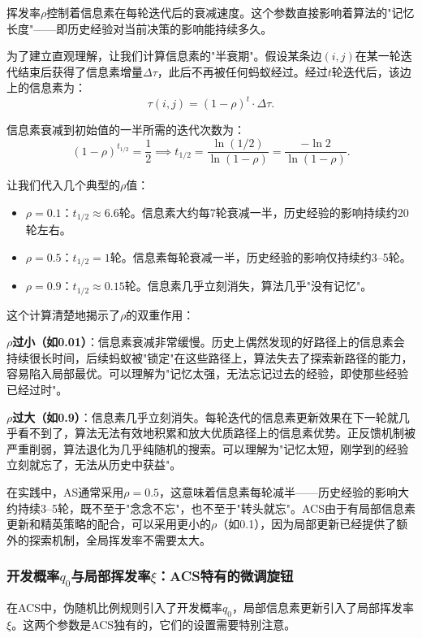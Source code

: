 \documentclass[lang=cn,zihao=-4,a4paper,fontset=windows]{beautybook}
\begin{document}
挥发率$\rho$控制着信息素在每轮迭代后的衰减速度。这个参数直接影响着算法的"记忆长度"——即历史经验对当前决策的影响能持续多久。

为了建立直观理解，让我们计算信息素的"半衰期"。假设某条边$(i,j)$在某一轮迭代结束后获得了信息素增量$\Delta\tau$，此后不再被任何蚂蚁经过。经过$t$轮迭代后，该边上的信息素为：
\[
\tau(i,j) = (1-\rho)^t \cdot \Delta\tau.
\]

信息素衰减到初始值的一半所需的迭代次数为：
\[
(1-\rho)^{t_{1/2}} = \frac{1}{2} \implies t_{1/2} = \frac{\ln(1/2)}{\ln(1-\rho)} = \frac{-\ln 2}{\ln(1-\rho)}.
\]

让我们代入几个典型的$\rho$值：
\begin{itemize}
    \item $\rho = 0.1$：$t_{1/2} \approx 6.6$轮。信息素大约每7轮衰减一半，历史经验的影响持续约20轮左右。
    \item $\rho = 0.5$：$t_{1/2} = 1$轮。信息素每轮衰减一半，历史经验的影响仅持续约3--5轮。
    \item $\rho = 0.9$：$t_{1/2} \approx 0.15$轮。信息素几乎立刻消失，算法几乎"没有记忆"。
\end{itemize}

这个计算清楚地揭示了$\rho$的双重作用：

\textbf{$\rho$过小（如0.01）}：信息素衰减非常缓慢。历史上偶然发现的好路径上的信息素会持续很长时间，后续蚂蚁被"锁定"在这些路径上，算法失去了探索新路径的能力，容易陷入局部最优。可以理解为"记忆太强，无法忘记过去的经验，即使那些经验已经过时"。

\textbf{$\rho$过大（如0.9）}：信息素几乎立刻消失。每轮迭代的信息素更新效果在下一轮就几乎看不到了，算法无法有效地积累和放大优质路径上的信息素优势。正反馈机制被严重削弱，算法退化为几乎纯随机的搜索。可以理解为"记忆太短，刚学到的经验立刻就忘了，无法从历史中获益"。

在实践中，AS通常采用$\rho = 0.5$，这意味着信息素每轮减半——历史经验的影响大约持续3--5轮，既不至于"念念不忘"，也不至于"转头就忘"。ACS由于有局部信息素更新和精英策略的配合，可以采用更小的$\rho$（如0.1），因为局部更新已经提供了额外的探索机制，全局挥发率不需要太大。

\subsubsection{开发概率$q_0$与局部挥发率$\xi$：ACS特有的微调旋钮}

在ACS中，伪随机比例规则引入了开发概率$q_0$，局部信息素更新引入了局部挥发率$\xi$。这两个参数是ACS独有的，它们的设置需要特别注意。
\end{document}
